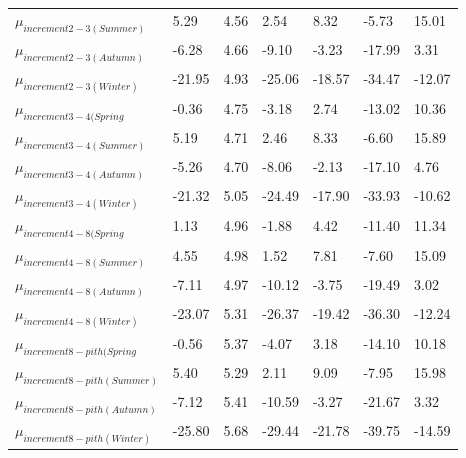 \documentclass{article}\usepackage[]{graphicx}\usepackage[]{color}
\begin{document}
\begin{table}[ht]
\begin{tabular}{|p{}|p{}|p{}|p{}|p{}|p{}|p{}|}
  $\mu_{increment 2-3 (Summer)}$ & 5.29 & 4.56 & 2.54 & 8.32 & -5.73 & 15.01 \\ 
  $\mu_{increment 2-3 (Autumn)}$ & -6.28 & 4.66 & -9.10 & -3.23 & -17.99 & 3.31 \\ 
  $\mu_{increment 2-3 (Winter)}$ & -21.95 & 4.93 & -25.06 & -18.57 & -34.47 & -12.07 \\ 
  $\mu_{increment 3-4 (Spring}$ & -0.36 & 4.75 & -3.18 & 2.74 & -13.02 & 10.36 \\ 
  $\mu_{increment 3-4 (Summer)}$ & 5.19 & 4.71 & 2.46 & 8.33 & -6.60 & 15.89 \\ 
  $\mu_{increment 3-4 (Autumn)}$ & -5.26 & 4.70 & -8.06 & -2.13 & -17.10 & 4.76 \\ 
  $\mu_{increment 3-4 (Winter)}$ & -21.32 & 5.05 & -24.49 & -17.90 & -33.93 & -10.62 \\ 
  $\mu_{increment 4-8 (Spring}$ & 1.13 & 4.96 & -1.88 & 4.42 & -11.40 & 11.34 \\ 
  $\mu_{increment 4-8 (Summer)}$ & 4.55 & 4.98 & 1.52 & 7.81 & -7.60 & 15.09 \\ 
  $\mu_{increment 4-8 (Autumn)}$ & -7.11 & 4.97 & -10.12 & -3.75 & -19.49 & 3.02 \\ 
  $\mu_{increment 4-8 (Winter)}$ & -23.07 & 5.31 & -26.37 & -19.42 & -36.30 & -12.24 \\ 
  $\mu_{increment 8-pith (Spring}$ & -0.56 & 5.37 & -4.07 & 3.18 & -14.10 & 10.18 \\ 
  $\mu_{increment 8-pith (Summer)}$ & 5.40 & 5.29 & 2.11 & 9.09 & -7.95 & 15.98 \\ 
  $\mu_{increment 8-pith (Autumn)}$ & -7.12 & 5.41 & -10.59 & -3.27 & -21.67 & 3.32 \\ 
  $\mu_{increment 8-pith (Winter)}$ & -25.80 & 5.68 & -29.44 & -21.78 & -39.75 & -14.59 \\ 
   \hline
\end{tabular}
\endgroup
\end{table}
\end{document}
